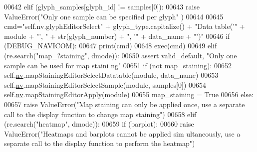 \begin{DoxyCode}
00642                 \textcolor{keywordflow}{elif} (glyph\_samples[glyph\_id] != samples[0]):
00643                     \textcolor{keywordflow}{raise} ValueError(\textcolor{stringliteral}{"Only one sample can be specified per glyph"
      })
00644 
00645                 cmd=\textcolor{stringliteral}{"self.nv.glyphEditorSelect"} + glyph\_type.capitalize() + \textcolor{stringliteral}{"Data
      table('"} + module +  \textcolor{stringliteral}{"', "} + str(glyph\_number) + \textcolor{stringliteral}{", '"} + data\_name + \textcolor{stringliteral}{"')"}
00646                 \textcolor{keywordflow}{if} (DEBUG\_NAVICOM):
00647                     \textcolor{keywordflow}{print}(cmd)
00648                 exec(cmd)
00649             \textcolor{keywordflow}{elif} (re.search(\textcolor{stringliteral}{"map\_?staining"}, dmode)):
00650                 \textcolor{keyword}{assert} valid\_default, \textcolor{stringliteral}{"Only one sample can be used for map staini
      ng"}
00651                 \textcolor{keywordflow}{if} (\textcolor{keywordflow}{not} map\_staining):
00652                     self.\hyperlink{classnavicom_1_1navicom_1_1NaviCom_af740fe52f9f3cfc076ae88ca696bd05e}{nv}.mapStainingEditorSelectDatatable(module, data\_name)
00653                     self.\hyperlink{classnavicom_1_1navicom_1_1NaviCom_af740fe52f9f3cfc076ae88ca696bd05e}{nv}.mapStainingEditorSelectSample(module, samples[0])
00654                     self.\hyperlink{classnavicom_1_1navicom_1_1NaviCom_af740fe52f9f3cfc076ae88ca696bd05e}{nv}.mapStainingEditorApply(module)
00655                     map\_staining = \textcolor{keyword}{True}
00656                 \textcolor{keywordflow}{else}:
00657                     \textcolor{keywordflow}{raise} ValueError(\textcolor{stringliteral}{"Map staining can only be applied once, use 
      a separate call to the display function to change map staining"})
00658             \textcolor{keywordflow}{elif} (re.search(\textcolor{stringliteral}{"heatmap"}, dmode)):
00659                 \textcolor{keywordflow}{if} (barplot):
00660                     \textcolor{keywordflow}{raise} ValueError(\textcolor{stringliteral}{"Heatmaps and barplots cannot be applied sim
      ultaneously, use a separate call to the display function to perform the heatmap"})
      

\end{DoxyCode}
